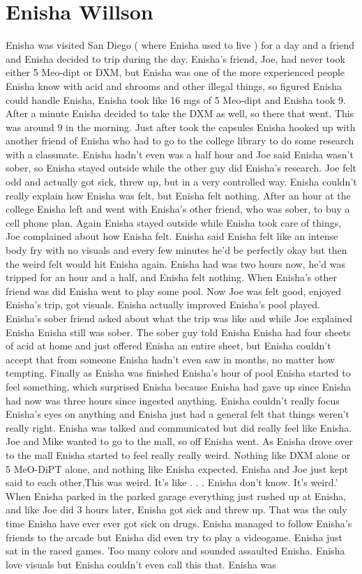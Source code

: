\documentclass[12pt]{book}
\begin{document}
\chapter{Enisha Willson}

Enisha was visited San Diego ( where Enisha used to live ) for a day and a friend and Enisha decided to trip during the day. Enisha's friend, Joe, had never took either 5 Meo-dipt or DXM, but Enisha was one of the more experienced people Enisha know with acid and shrooms and other illegal things, so figured Enisha could handle Enisha, Enisha took like 16 mgs of 5 Meo-dipt and Enisha took 9. After a minute Enisha decided to take the DXM as well, so there that went. This was around 9 in the morning. Just after took the capsules Enisha hooked up with another friend of Enisha who had to go to the college library to do some research with a classmate. Enisha hadn't even was a half hour and Joe said Enisha wasn't sober, so Enisha stayed outside while the other guy did Enisha's research. Joe felt odd and actually got sick, threw up, but in a very controlled way. Enisha couldn't really explain how Enisha was felt, but Enisha felt nothing. After an hour at the college Enisha left and went with Enisha's other friend, who was sober, to buy a cell phone plan. Again Enisha stayed outside while Enisha took care of things, Joe complained about how Enisha felt. Enisha said Enisha felt like an intense body fry with no visuals and every few minutes he'd be perfectly okay but then the weird felt would hit Enisha again. Enisha had was two hours now, he'd was tripped for an hour and a half, and Enisha felt nothing. When Enisha's other friend was did Enisha went to play some pool. Now Joe was felt good, enjoyed Enisha's trip, got visuals. Enisha actually improved Enisha's pool played. Enisha's sober friend asked about what the trip was like and while Joe explained Enisha Enisha still was sober. The sober guy told Enisha Enisha had four sheets of acid at home and just offered Enisha an entire sheet, but Enisha couldn't accept that from someone Enisha hadn't even saw in months, no matter how tempting. Finally as Enisha was finished Enisha's hour of pool Enisha started to feel something, which surprised Enisha because Enisha had gave up since Enisha had now was three hours since ingested anything. Enisha couldn't really focus Enisha's eyes on anything and Enisha just had a general felt that things weren't really right. Enisha was talked and communicated but did really feel like Enisha. Joe and Mike wanted to go to the mall, so off Enisha went. As Enisha drove over to the mall Enisha started to feel really really weird. Nothing like DXM alone or 5 MeO-DiPT alone, and nothing like Enisha expected. Enisha and Joe just kept said to each other,This was weird. It's like . . .  Enisha don't know. It's weird.' When Enisha parked in the parked garage everything just rushed up at Enisha, and like Joe did 3 hours later, Enisha got sick and threw up. That was the only time Enisha have ever ever got sick on drugs. Enisha managed to follow Enisha's friends to the arcade but Enisha did even try to play a videogame. Enisha just sat in the raced games. Too many colors and sounded assaulted Enisha. Enisha love visuals but Enisha couldn't even call this that. Enisha was 
\end{document}
